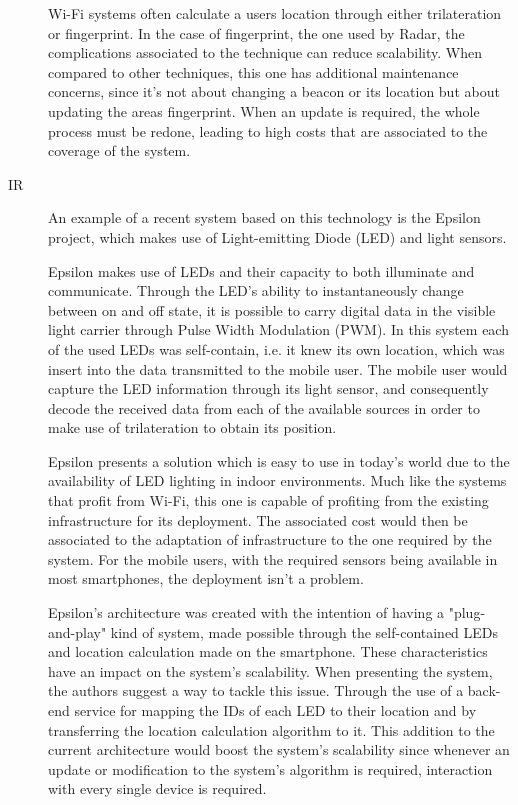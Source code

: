 \begin{description}
 
Wi-Fi systems often calculate a users location through either trilateration or fingerprint. In the case of fingerprint, the one used by Radar, the complications associated to the technique can reduce scalability. When compared to other techniques, this one has additional maintenance concerns, since it's not about changing a beacon or its location but about updating the areas fingerprint. When an update is required, the whole process must be redone, leading to high costs that are associated to the coverage of the system. 
  
 
 
\item[\acf{IR}] An example of a recent system based on this technology is the Epsilon project\cite{epsilon}, which makes use of Light-emitting Diode (LED) and light sensors.   
 
 
Epsilon makes use of LEDs and their capacity to both illuminate and communicate. Through the LED's ability to instantaneously change between on and off state, it is possible to carry digital data in the visible light carrier through Pulse Width Modulation (PWM). In this system each of the used LEDs was self-contain, i.e. it knew its own location, which was insert into the data transmitted to the mobile user. The mobile user would capture the LED information through its light sensor, and consequently decode the received data from each of the available sources in order to make use of trilateration to obtain its position. 
 
 
Epsilon presents a solution which is easy to use in today's world due to the availability of LED lighting in indoor environments. Much like the systems that profit from Wi-Fi, this one is capable of profiting from the existing infrastructure for its deployment. The associated cost would then be associated to the adaptation of infrastructure to the one required by the system. For the mobile users, with the required sensors being available in most smartphones, the deployment isn't a problem. 
 
 
Epsilon's architecture was created with the intention of having a "plug-and-play" kind of system, made possible through the self-contained LEDs and location calculation made on the smartphone. These characteristics have an impact on the system's scalability. 
When presenting the system, the authors suggest a way to tackle this issue. Through the use of a back-end service for mapping the IDs of each LED to their location and by transferring the location calculation algorithm to it. This addition to the current architecture would boost the system's scalability since whenever an update or modification to the system's algorithm is required, interaction with every single device is required. 
 

\end{description}
